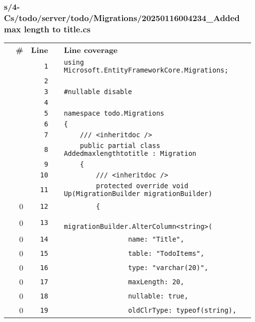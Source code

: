 \documentclass[a4paper,landscape,10pt]{article}
\begin{document}
\subsubsection{s/4-Cs/todo/server/todo/Migrations/20250116004234\_Added max length to title.cs}
\begin{longtable}[l]{lrrll}
\textbf{} & \textbf{\#} & \textbf{Line} & \textbf{} & \textbf{Line coverage}\\
\cellcolor{gray} &  & \verb~1~ & & \verb~using Microsoft.EntityFrameworkCore.Migrations;~\\
\cellcolor{gray} &  & \verb~2~ & & \verb~~\\
\cellcolor{gray} &  & \verb~3~ & & \verb~#nullable disable~\\
\cellcolor{gray} &  & \verb~4~ & & \verb~~\\
\cellcolor{gray} &  & \verb~5~ & & \verb~namespace todo.Migrations~\\
\cellcolor{gray} &  & \verb~6~ & & \verb~{~\\
\cellcolor{gray} &  & \verb~7~ & & \verb~    /// <inheritdoc />~\\
\cellcolor{gray} &  & \verb~8~ & & \verb~    public partial class Addedmaxlengthtotitle : Migration~\\
\cellcolor{gray} &  & \verb~9~ & & \verb~    {~\\
\cellcolor{gray} &  & \verb~10~ & & \verb~        /// <inheritdoc />~\\
\cellcolor{gray} &  & \verb~11~ & & \verb~        protected override void Up(MigrationBuilder migrationBuilder)~\\
\cellcolor{red} & 0 & \verb~12~ & & \verb~        {~\\
\cellcolor{red} & 0 & \verb~13~ & & \verb~            migrationBuilder.AlterColumn<string>(~\\
\cellcolor{red} & 0 & \verb~14~ & & \verb~                name: "Title",~\\
\cellcolor{red} & 0 & \verb~15~ & & \verb~                table: "TodoItems",~\\
\cellcolor{red} & 0 & \verb~16~ & & \verb~                type: "varchar(20)",~\\
\cellcolor{red} & 0 & \verb~17~ & & \verb~                maxLength: 20,~\\
\cellcolor{red} & 0 & \verb~18~ & & \verb~                nullable: true,~\\
\cellcolor{red} & 0 & \verb~19~ & & \verb~                oldClrType: typeof(string),~\\

\end{longtable}
\end{document}
